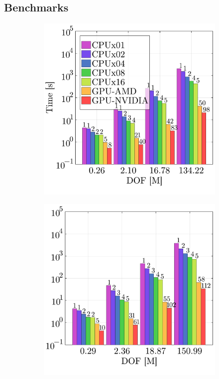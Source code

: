 \documentclass[10pt,a4paper]{article}
\begin{document}
\subsection{Benchmarks}
\begin{figure}[!t]
  \centering
  \begin{subfigure}[t]{0.32\linewidth}
      \centering
      \includegraphics[width=\linewidth]{img/tgv_benchmark.pdf}
  \end{subfigure}
  \begin{subfigure}[t]{0.32\linewidth}
    \centering\hspace*{-0.2cm}
    \includegraphics[width=\linewidth]{img/sphere_benchmark.pdf}

\end{subfigure}
\end{figure}
\end{document}
